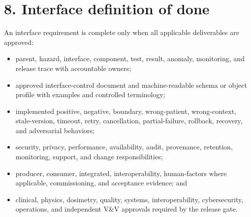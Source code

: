 \documentclass[11pt,letterpaper]{article}
\begin{document}
\section{8. Interface definition of done}
An interface requirement is complete only when all applicable deliverables are approved:
\begin{itemize}
\item parent, hazard, interface, component, test, result, anomaly, monitoring, and release trace with accountable owners;
\item approved interface-control document and machine-readable schema or object profile with examples and controlled terminology;
\item implemented positive, negative, boundary, wrong-patient, wrong-context, stale-version, timeout, retry, cancellation, partial-failure, rollback, recovery, and adversarial behaviors;
\item security, privacy, performance, availability, audit, provenance, retention, monitoring, support, and change responsibilities;
\item producer, consumer, integrated, interoperability, human-factors where applicable, commissioning, and acceptance evidence; and
\item clinical, physics, dosimetry, quality, systems, interoperability, cybersecurity, operations, and independent V\&V approvals required by the release gate.
\end{itemize}
\end{document}
